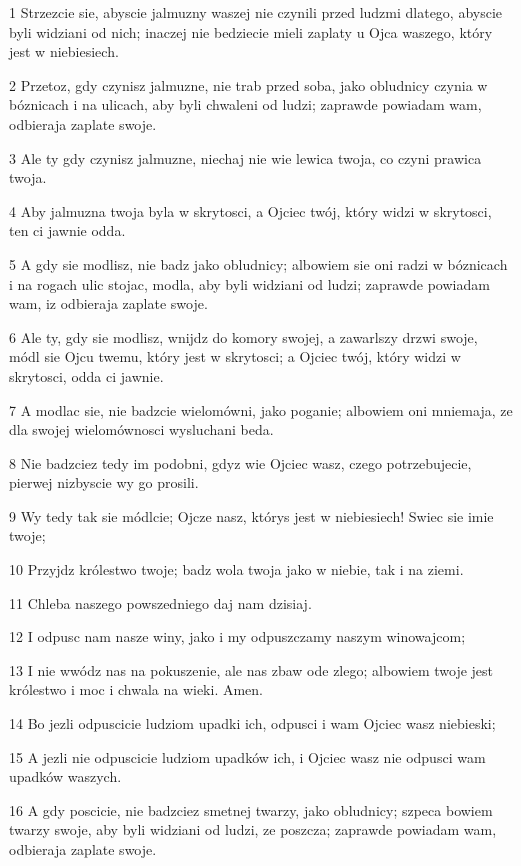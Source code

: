 \par 1 Strzezcie sie, abyscie jalmuzny waszej nie czynili przed ludzmi dlatego, abyscie byli widziani od nich; inaczej nie bedziecie mieli zaplaty u Ojca waszego, który jest w niebiesiech.
\par 2 Przetoz, gdy czynisz jalmuzne, nie trab przed soba, jako obludnicy czynia w bóznicach i na ulicach, aby byli chwaleni od ludzi; zaprawde powiadam wam, odbieraja zaplate swoje.
\par 3 Ale ty gdy czynisz jalmuzne, niechaj nie wie lewica twoja, co czyni prawica twoja.
\par 4 Aby jalmuzna twoja byla w skrytosci, a Ojciec twój, który widzi w skrytosci, ten ci jawnie odda.
\par 5 A gdy sie modlisz, nie badz jako obludnicy; albowiem sie oni radzi w bóznicach i na rogach ulic stojac, modla, aby byli widziani od ludzi; zaprawde powiadam wam, iz odbieraja zaplate swoje.
\par 6 Ale ty, gdy sie modlisz, wnijdz do komory swojej, a zawarlszy drzwi swoje, módl sie Ojcu twemu, który jest w skrytosci; a Ojciec twój, który widzi w skrytosci, odda ci jawnie.
\par 7 A modlac sie, nie badzcie wielomówni, jako poganie; albowiem oni mniemaja, ze dla swojej wielomównosci wysluchani beda.
\par 8 Nie badzciez tedy im podobni, gdyz wie Ojciec wasz, czego potrzebujecie, pierwej nizbyscie wy go prosili.
\par 9 Wy tedy tak sie módlcie; Ojcze nasz, którys jest w niebiesiech! Swiec sie imie twoje;
\par 10 Przyjdz królestwo twoje; badz wola twoja jako w niebie, tak i na ziemi.
\par 11 Chleba naszego powszedniego daj nam dzisiaj.
\par 12 I odpusc nam nasze winy, jako i my odpuszczamy naszym winowajcom;
\par 13 I nie wwódz nas na pokuszenie, ale nas zbaw ode zlego; albowiem twoje jest królestwo i moc i chwala na wieki. Amen.
\par 14 Bo jezli odpuscicie ludziom upadki ich, odpusci i wam Ojciec wasz niebieski;
\par 15 A jezli nie odpuscicie ludziom upadków ich, i Ojciec wasz nie odpusci wam upadków waszych.
\par 16 A gdy poscicie, nie badzciez smetnej twarzy, jako obludnicy; szpeca bowiem twarzy swoje, aby byli widziani od ludzi, ze poszcza; zaprawde powiadam wam, odbieraja zaplate swoje.
